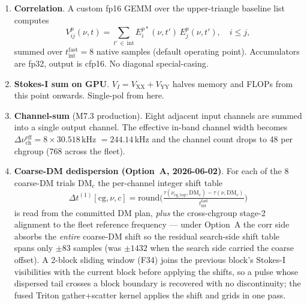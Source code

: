 \documentclass[11pt,a4paper]{article}
\newcommand{\DM}{\mathrm{DM}}
\newcommand{\dnu}{\Delta\nu_\mathrm{ch}}
\begin{document}
\begin{enumerate}[topsep=2pt,itemsep=2pt]
\item \textbf{Correlation}.  A custom fp16 GEMM over the upper-triangle
    baseline list computes
    \begin{equation}
    V_{ij}^p(\nu,t) = \sum_{t'\,\in\,\text{int}} E_i^{p*}(\nu,t')\,E_j^p(\nu,t'),
    \quad i\le j,
    \label{eq:corr}
    \end{equation}
    summed over $t_\mathrm{int}^\mathrm{fast} = 8$ native samples
    (default operating point).  Accumulators are fp32, output is
    cfp16.  No diagonal special-casing.

\item \textbf{Stokes-I sum on GPU}.  $V_I = V_\mathrm{XX}+V_\mathrm{YY}$
    halves memory and FLOPs from this point onwards.  Single-pol from
    here.

\item \textbf{Channel-sum} (M7.3 production).  Eight adjacent input
    channels are summed into a single output channel.  The effective
    in-band channel width becomes $\dnu^\mathrm{eff} = 8\times30.518$\,kHz
    $= 244.14$\,kHz and the channel count drops to 48 per chgroup
    (768 across the fleet).

\item \textbf{Coarse-DM dedispersion (Option~A, 2026-06-02)}.  For
    each of the 8 coarse-DM trials $\DM_c$ the per-channel integer
    shift table
    \begin{equation}
       \Delta t^{(1)}[\mathrm{cg}, \nu, c]
       = \mathrm{round}\Big(
            \tfrac{\tau(\nu_\mathrm{cg,top}, \DM_c) - \tau(\nu, \DM_c)}
                  {t_\mathrm{int}^\mathrm{fast}}\Big)
       \label{eq:s1shift}
    \end{equation}
    is read from the committed DM plan, \emph{plus} the
    cross-chgroup stage-2 alignment to the fleet reference frequency
    --- under Option~A the corr side absorbs the \emph{entire}
    coarse-DM shift so the residual search-side shift table spans
    only $\pm 83$ samples (was $\pm 1432$ when the search side
    carried the coarse offset).  A 2-block sliding window (F34)
    joins the previous block's Stokes-I visibilities with the
    current block before applying the shifts, so a pulse whose
    dispersed tail crosses a block boundary is recovered with no
    discontinuity; the fused Triton gather+scatter kernel applies
    the shift and grids in one pass.


\end{enumerate}
\end{document}
